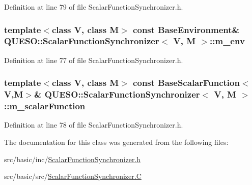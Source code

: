 Definition at line 79 of file Scalar\-Function\-Synchronizer.\-h.

\hypertarget{class_q_u_e_s_o_1_1_scalar_function_synchronizer_aa77a3d3b53267ef7c731836faaa082fb}{
\subsubsection[{m\-\_\-env}]{\setlength{\rightskip}{0pt plus 5cm}template$<$class V, class M$>$ const {\bf Base\-Environment}\& {\bf Q\-U\-E\-S\-O\-::\-Scalar\-Function\-Synchronizer}$<$ V, M $>$\-::m\-\_\-env\hspace{0.3cm}{\ttfamily [private]}}}\label{class_q_u_e_s_o_1_1_scalar_function_synchronizer_aa77a3d3b53267ef7c731836faaa082fb}


Definition at line 77 of file Scalar\-Function\-Synchronizer.\-h.

\hypertarget{class_q_u_e_s_o_1_1_scalar_function_synchronizer_a6b24acdd3185e57cae74e6d5aedb90bf}{
\subsubsection[{m\-\_\-scalar\-Function}]{\setlength{\rightskip}{0pt plus 5cm}template$<$class V, class M$>$ const {\bf Base\-Scalar\-Function}$<$V,M$>$\& {\bf Q\-U\-E\-S\-O\-::\-Scalar\-Function\-Synchronizer}$<$ V, M $>$\-::m\-\_\-scalar\-Function\hspace{0.3cm}{\ttfamily [private]}}}\label{class_q_u_e_s_o_1_1_scalar_function_synchronizer_a6b24acdd3185e57cae74e6d5aedb90bf}


Definition at line 78 of file Scalar\-Function\-Synchronizer.\-h.



The documentation for this class was generated from the following files\-:\begin{DoxyCompactItemize}
\item 
src/basic/inc/\hyperlink{_scalar_function_synchronizer_8h}{Scalar\-Function\-Synchronizer.\-h}\item 
src/basic/src/\hyperlink{_scalar_function_synchronizer_8_c}{Scalar\-Function\-Synchronizer.\-C}\end{DoxyCompactItemize}
